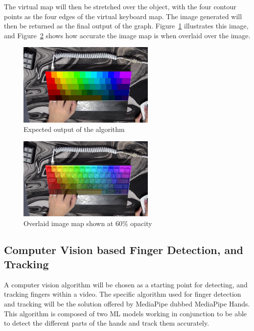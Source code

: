 \documentclass{report}
\begin{document}
The virtual map will then be stretched over the object, with the four contour
points as the four edges of the virtual keyboard map. The image generated will
then be returned as the final output of the graph.
Figure~\ref{fig:metho-algo-key-overlay} illustrates this image, and
Figure~\ref{fig:metho-algo-key-half} shows how accurate the image map is when
overlaid over the image.

\begin{figure}[H]
	\centering
	\includegraphics[width=0.6\textwidth]{image-map-final.png}
	\caption{Expected output of the algorithm}
	\label{fig:metho-algo-key-overlay}
	\centering
\end{figure}

\begin{figure}[H]
	\centering
	\includegraphics[width=0.6\textwidth]{image-map-half.png}
	\caption{Overlaid image map shown at 60\% opacity}
	\label{fig:metho-algo-key-half}
	\centering
\end{figure}

\subsection{Computer Vision based Finger Detection, and Tracking}
\label{section:metho-algo-finger}

A computer vision algorithm will be chosen as a starting point for detecting,
and tracking fingers within a video. The specific algorithm used for finger
detection and tracking will be the solution offered by MediaPipe dubbed
MediaPipe Hands. This algorithm is composed of two ML models working in
conjunction to be able to detect the different parts of the hands and track them
accurately.
\end{document}
